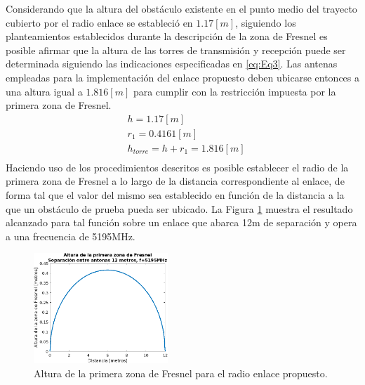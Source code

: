 \documentclass[conference]{IEEEtran}
\begin{document}
Considerando que la altura del obstáculo existente en el punto medio del trayecto cubierto por el radio enlace se estableció en $1.17[m]$, siguiendo 
los planteamientos establecidos durante la descripción de la zona de Fresnel es posible afirmar que la altura de las torres de transmisión y recepción 
puede ser determinada siguiendo las indicaciones especificadas en \ref{eq:Eq3}. Las antenas empleadas para la implementación del enlace propuesto deben ubicarse entonces
a una altura igual a $1.816[m]$ para cumplir con la restricción impuesta por la primera zona de Fresnel.
\begin{equation}
    \label{eq:Eq3}
    \begin{aligned}
        &h =1.17[m]\\
        &r_1 = 0.4161[m]\\
        &h_{torre} = h+r_{1}=1.816[m]\\
    \end{aligned}
\end{equation}
Haciendo uso de los procedimientos descritos es posible establecer el radio de la primera zona de Fresnel a lo
largo de la distancia correspondiente al enlace, de forma tal que el valor del mismo sea establecido en función 
de la distancia a la que un obstáculo de prueba pueda ser ubicado. La Figura \ref{fig:Altura_Fresnel} muestra el resultado alcanzado para 
tal función sobre un enlace que abarca 12m de separación y opera a una frecuencia de 5195MHz.
\begin{figure}
    \centering
          \includegraphics[width=0.45\textwidth]{Altura_Fresnel.png}
        \caption{Altura de la primera zona de Fresnel para el radio enlace propuesto.
        }
        \label{fig:Altura_Fresnel}
\end{figure}
\end{document}
